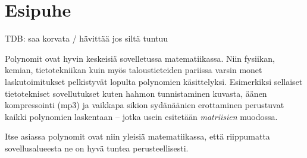 \chapter{Esipuhe}

TDB: saa korvata / hävittää jos siltä tuntuu

Polynomit ovat hyvin keskeisiä sovelletussa matematiikassa.
Niin fysiikan, kemian, tietotekniikan kuin myös taloustieteiden
pariissa varsin monet laskutoimitukset pelkistyvät lopulta
polynomien käsittelyksi. Esimerkiksi sellaiset tietotekniset
sovellutukset kuten hahmon tunnistaminen kuvasta, äänen
kompressointi (mp3) ja vaikkapa sikion sydänäänien erottaminen
perustuvat kaikki polynomien laskentaan -- jotka usein esitetään
\emph{matriisien} muodossa.

Itse asiassa polynomit ovat niin yleisiä matematiikassa, että riippumatta
sovellusalueesta ne on hyvä tuntea perusteellisesti.
